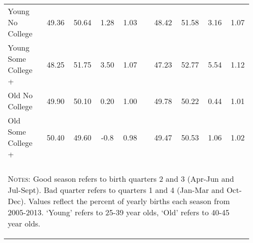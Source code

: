 \begin{table}[htpb!]
\begin{center}
{\begin{tabular}{lccccp{6mm}cccc}
Young No College&49.36&50.64&1.28&1.03
&&48.42&51.58&3.16&1.07
\\ 
Young Some College +&48.25&51.75&3.50&1.07
&&47.23&52.77&5.54&1.12
\\ 
Old No College&49.90&50.10&0.20&1.00
&&49.78&50.22&0.44&1.01
\\ 
Old Some College +&50.40&49.60&-0.8&0.98
&&49.47&50.53&1.06&1.02
\\ 
 &&&&&&&&& \\
\midrule\multicolumn{10}{p{15.0cm}}{\begin{footnotesize}\textsc{Notes:} Good season refers to birth quarters 2 and 3 (Apr-Jun and Jul-Sept).  Bad quarter refers to quarters 1 and 4 (Jan-Mar and Oct-Dec).  Values reflect the percent of yearly births each season from 2005-2013. `Young' refers to 25-39 year olds, `Old' refers to 40-45 year olds. 
\end{footnotesize}} \\ \bottomrule 
\end{tabular}}
\end{center}\end{table}
